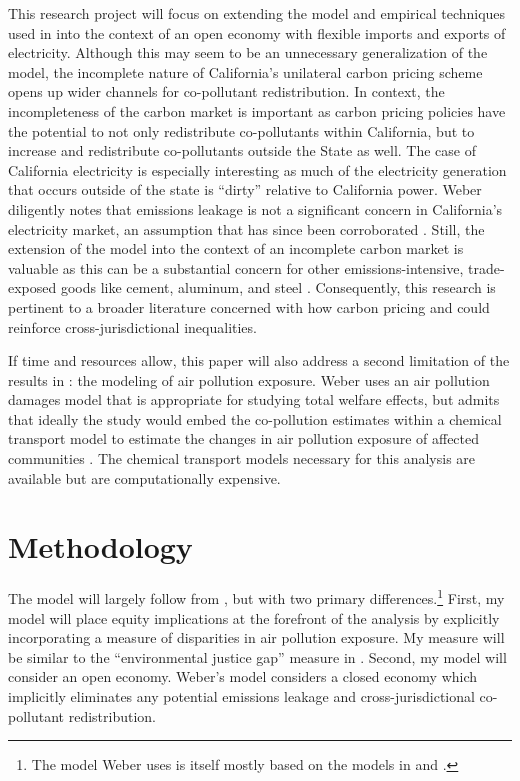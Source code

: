 \documentclass[11pt]{article}
\begin{document}
This research project will focus on extending the model and empirical techniques used in \cite{weber2021dynamic} into the context of an open economy with flexible imports and exports of electricity. Although this may seem to be an unnecessary generalization of the model, the incomplete nature of California's unilateral carbon pricing scheme opens up wider channels for co-pollutant redistribution. In context, the incompleteness of the carbon market is important as carbon pricing policies have the potential to not only redistribute co-pollutants within California, but to increase and redistribute co-pollutants outside the State as well. The case of California electricity is especially interesting as much of the electricity generation that occurs outside of the state is ``dirty” relative to California power. Weber diligently notes that emissions leakage is not a significant concern in California's electricity market, an assumption that has since been corroborated \citep{burtraw2018}. Still, the extension of the model into the context of an incomplete carbon market is valuable as this can be a substantial concern for other emissions-intensive, trade-exposed goods like cement, aluminum, and steel \citep{fowlie2022mitigating}. Consequently, this research is pertinent to a broader literature concerned with how carbon pricing and could reinforce cross-jurisdictional inequalities. 

If time and resources allow, this paper will also address a second limitation of the results in \cite{weber2021dynamic}: the modeling of air pollution exposure. Weber uses an air pollution damages model that is appropriate for studying total welfare effects, but admits that ideally the study would embed the co-pollution estimates within a chemical transport model to estimate the changes in air pollution exposure of affected communities \citep[the approach in~][]{hernandez2023environmental}. The chemical transport models necessary for this analysis are available but are computationally expensive.


\section*{Methodology}

The model will largely follow from \cite{weber2021dynamic}, but with two primary differences.\footnote{The model Weber uses is itself mostly based on the models in \cite{cullen2015} and \cite{cullen2017}.} First, my model will place equity implications at the forefront of the analysis by explicitly incorporating a measure of disparities in air pollution exposure. My measure will be similar to the ``environmental justice gap'' measure in \cite{hernandez2022importance}. Second, my model will consider an open economy. Weber's model considers a closed economy which implicitly eliminates any potential emissions leakage and cross-jurisdictional co-pollutant redistribution. 
\end{document}
